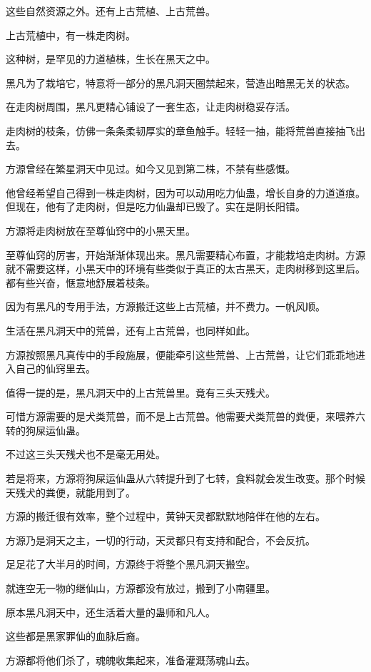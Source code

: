 \begin{this_body}
这些自然资源之外。还有上古荒植、上古荒兽。

上古荒植中，有一株走肉树。

这种树，是罕见的力道植株，生长在黑天之中。

黑凡为了栽培它，特意将一部分的黑凡洞天圈禁起来，营造出暗黑无关的状态。

在走肉树周围，黑凡更精心铺设了一套生态，让走肉树稳妥存活。

走肉树的枝条，仿佛一条条柔韧厚实的章鱼触手。轻轻一抽，能将荒兽直接抽飞出去。

方源曾经在繁星洞天中见过。如今又见到第二株，不禁有些感慨。

他曾经希望自己得到一株走肉树，因为可以动用吃力仙蛊，增长自身的力道道痕。但现在，他有了走肉树，但是吃力仙蛊却已毁了。实在是阴长阳错。

方源将走肉树放在至尊仙窍中的小黑天里。

至尊仙窍的厉害，开始渐渐体现出来。黑凡需要精心布置，才能栽培走肉树。方源就不需要这样，小黑天中的环境有些类似于真正的太古黑天，走肉树移到这里后。都有些兴奋，惬意地舒展着枝条。

因为有黑凡的专用手法，方源搬迁这些上古荒植，并不费力。一帆风顺。

生活在黑凡洞天中的荒兽，还有上古荒兽，也同样如此。

方源按照黑凡真传中的手段施展，便能牵引这些荒兽、上古荒兽，让它们乖乖地进入自己的仙窍里去。

值得一提的是，黑凡洞天中的上古荒兽里。竟有三头天残犬。

可惜方源需要的是犬类荒兽，而不是上古荒兽。他需要犬类荒兽的粪便，来喂养六转的狗屎运仙蛊。

不过这三头天残犬也不是毫无用处。

若是将来，方源将狗屎运仙蛊从六转提升到了七转，食料就会发生改变。那个时候天残犬的粪便，就能用到了。

方源的搬迁很有效率，整个过程中，黄钟天灵都默默地陪伴在他的左右。

方源乃是洞天之主，一切的行动，天灵都只有支持和配合，不会反抗。

足足花了大半月的时间，方源终于将整个黑凡洞天搬空。

就连空无一物的继仙山，方源都没有放过，搬到了小南疆里。

原本黑凡洞天中，还生活着大量的蛊师和凡人。

这些都是黑家罪仙的血脉后裔。

方源都将他们杀了，魂魄收集起来，准备灌溉荡魂山去。


\end{this_body}
